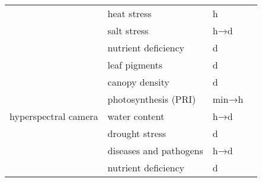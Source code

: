 \begin{sidewaystable}[hbpt]
\begin{tabular}{llll}
                                                           & heat stress                                             & h                         & \textcite{briantais1996}                         \\
                                                           & salt stress                                             & h→d      & \textcite{moradi2007}                            \\
                                                           & nutrient deficiency                                     & d                          & \textcite{ciompi1996}                            \\
        \midrule
        \multirow{7}{6cm}{hyperspectral camera}            & leaf pigments                                           & d                          & \textcite{blackburn2007}                         \\
                                                           & canopy density                                          & d                          & \textcite{carlson1997}                           \\
                                                           & photosynthesis (PRI)                                    & min→h   & \textcite{inoue2008}                             \\
                                                           & water content                                           & h→d      & \textcite{whetton2018}                           \\
                                                           & drought stress                                          & d                          & \textcite{berger2010}                            \\
                                                           & diseases and pathogens                                  & h→d      & \textcite{bock2010,vandevijver2020}              \\
                                                           & nutrient deficiency                                     & d                          & \textcite{zhao2005}                              \\
        \bottomrule
    \end{tabular}
    
\end{sidewaystable}